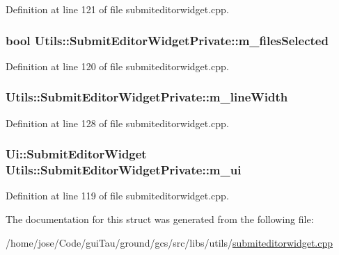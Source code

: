 Definition at line 121 of file submiteditorwidget.\-cpp.

\hypertarget{struct_utils_1_1_submit_editor_widget_private_ae84602f3befda38e44858e5cc60f79be}{
\subsubsection[{m\-\_\-files\-Selected}]{\setlength{\rightskip}{0pt plus 5cm}bool Utils\-::\-Submit\-Editor\-Widget\-Private\-::m\-\_\-files\-Selected}}\label{struct_utils_1_1_submit_editor_widget_private_ae84602f3befda38e44858e5cc60f79be}


Definition at line 120 of file submiteditorwidget.\-cpp.

\hypertarget{struct_utils_1_1_submit_editor_widget_private_a26a9f360cbc9440cbbdcb9f5b9897807}{
\subsubsection[{m\-\_\-line\-Width}]{ Utils\-::\-Submit\-Editor\-Widget\-Private\-::m\-\_\-line\-Width}}\label{struct_utils_1_1_submit_editor_widget_private_a26a9f360cbc9440cbbdcb9f5b9897807}


Definition at line 128 of file submiteditorwidget.\-cpp.

\hypertarget{struct_utils_1_1_submit_editor_widget_private_a5476c01db3bc97951db656048ab0c0c8}{
\subsubsection[{m\-\_\-ui}]{\setlength{\rightskip}{0pt plus 5cm}Ui\-::\-Submit\-Editor\-Widget Utils\-::\-Submit\-Editor\-Widget\-Private\-::m\-\_\-ui}}\label{struct_utils_1_1_submit_editor_widget_private_a5476c01db3bc97951db656048ab0c0c8}


Definition at line 119 of file submiteditorwidget.\-cpp.



The documentation for this struct was generated from the following file\-:\begin{DoxyCompactItemize}
\item 
/home/jose/\-Code/gui\-Tau/ground/gcs/src/libs/utils/\hyperlink{submiteditorwidget_8cpp}{submiteditorwidget.\-cpp}\end{DoxyCompactItemize}
